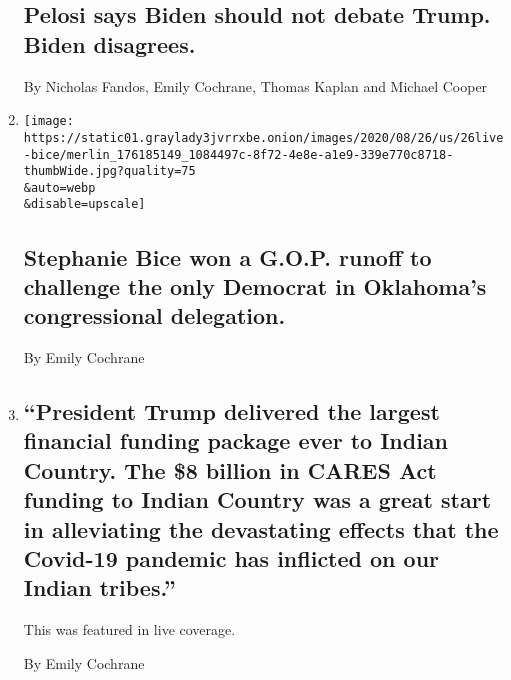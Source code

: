 \begin{enumerate}
  \hypertarget{pelosi-says-biden-should-not-debate-trump-biden-disagrees}{%
  \subsection{Pelosi says Biden should not debate Trump. Biden
  disagrees.}\label{pelosi-says-biden-should-not-debate-trump-biden-disagrees}}

  By Nicholas Fandos, Emily Cochrane, Thomas Kaplan and Michael Cooper
\item
  \href{/2020/08/26/us/politics/stephanie-bice-won-a-gop-runoff-to-challenge-the-only-democrat-in-oklahomas-congressional-delegation.html}{}

  \texttt{[image: https://static01.graylady3jvrrxbe.onion/images/2020/08/26/us/26live-bice/merlin\_176185149\_1084497c-8f72-4e8e-a1e9-339e770c8718-thumbWide.jpg?quality=75\\\&auto=webp\\\&disable=upscale]}

  \hypertarget{stephanie-bice-won-a-gop-runoff-to-challenge-the-only-democrat-in-oklahomas-congressional-delegation}{%
  \subsection{Stephanie Bice won a G.O.P. runoff to challenge the only
  Democrat in Oklahoma's congressional
  delegation.}\label{stephanie-bice-won-a-gop-runoff-to-challenge-the-only-democrat-in-oklahomas-congressional-delegation}}

  By Emily Cochrane
\item
  \href{/live/2020/08/25/us/rnc-fact-check/president-trump-delivered-the-largest-financial-funding-package-ever-to-indian-country-the-8-billion-in-cares-act-funding-to-ind}{}

  \hypertarget{president-trump-delivered-the-largest-financial-funding-package-ever-to-indian-country-the-8-billion-in-cares-act-funding-to-indian-country-was-a-great-start-in-alleviating-the-devastating-effects-that-the-covid-19-pandemic-has-inflicted-on-our-indian-tribes}{%
  \subsection{``President Trump delivered the largest financial funding
  package ever to Indian Country. The \$8 billion in CARES Act funding
  to Indian Country was a great start in alleviating the devastating
  effects that the Covid-19 pandemic has inflicted on our Indian
  tribes.''}\label{president-trump-delivered-the-largest-financial-funding-package-ever-to-indian-country-the-8-billion-in-cares-act-funding-to-indian-country-was-a-great-start-in-alleviating-the-devastating-effects-that-the-covid-19-pandemic-has-inflicted-on-our-indian-tribes}}

  This was featured in live coverage.

  By Emily Cochrane
\end{enumerate}

